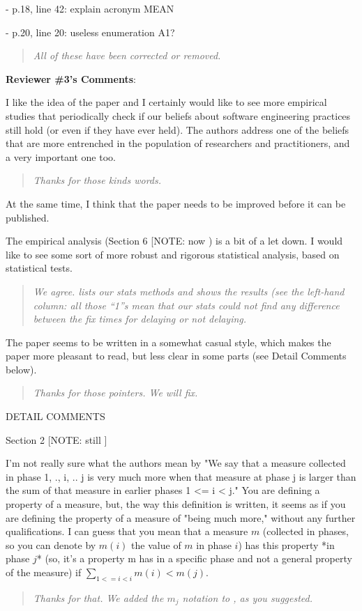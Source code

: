 - p.18, line 42: explain acronym MEAN 

- p.20, line 20: useless enumeration A1?

\begin{quote}{\em
 All of these have been corrected or removed.
 }\end{quote}
 

{\bf  Reviewer \#3's Comments}: 

I like the idea of the paper and I certainly
would like to see more empirical studies that periodically
check if our beliefs about software engineering practices
still hold (or even if they have ever held). The authors
address one of the beliefs that are more entrenched in the
population of researchers and practitioners, and a very
important one too.


\begin{quote}{\em
Thanks for those kinds words.
 }\end{quote}

At the same time, I think that the paper needs to be
improved before it can be published.

The empirical analysis (Section 6 [NOTE: now ) is a bit of a let down. I
would like to see some sort of more robust and rigorous
statistical analysis, based on statistical tests.



\begin{quote}{\em
We agree.  lists our stats methods and 
shows the results (see the left-hand column: all those ``1''s mean
that our stats could not find any difference between the fix times for
delaying or not delaying.
 }\end{quote}
 
 
The paper seems to be written in a somewhat casual style,
which makes the paper more pleasant to read, but less clear
in some parts (see Detail Comments below).

\begin{quote}{\em
Thanks for those pointers. We will fix.
 }\end{quote}

DETAIL COMMENTS

Section 2 [NOTE: still ]

I'm not really sure what the authors mean by "We say that a
measure collected in phase 1, ., i, .. j is very much more
when that measure at phase j is larger than the sum of that
measure in earlier phases 1 <= i < j." You are defining a
property of a measure, but, the way this definition is
written, it seems as if you are defining the property of a
measure of "being much more," without any further
qualifications.  I can guess that you mean that a measure
$m$ (collected in phases, so you can denote by $m(i)$ the
value of $m$ in phase $i$) has this property *in phase $j$*
(so, it's a property m has in a specific phase and not a
general property of the measure) if $\sum_{1 <= i < i} m(i)
< m(j)$. 
\begin{quote}{\em
Thanks for that. We added the $m_j$ notation to , as you suggested.
 }\end{quote}
 
